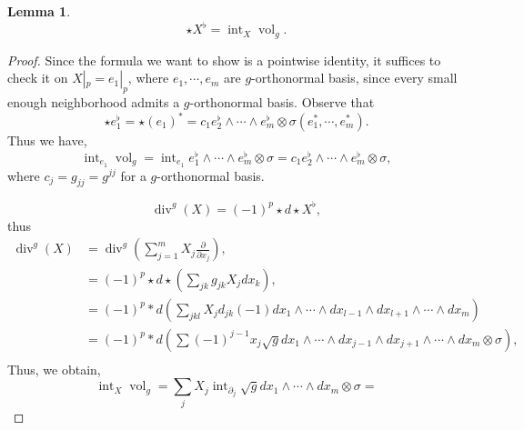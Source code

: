 \documentclass[8pt]{article}
\newtheorem{lemma}{Lemma}[section]
\DeclareMathOperator{\divergence}{div}
\DeclareMathOperator{\interior}{int}
\DeclareMathOperator{\vol}{vol}
\newcommand{\M}[0]{\mathcal{M}}
\newcommand{\cinf}[0]{\mathcal{C}^\infty}
\newcommand{\pd}[2]{{\frac {\partial #1} {\partial #2}}}
\begin{document}
\begin{lemma}
  \begin{equation*}
    \star X^\flat = \interior_X\vol_g.
  \end{equation*}
\end{lemma}
\begin{proof}
  Since the formula we want to show is a pointwise identity, it suffices to check it on $X|_p=e_1|_p$, where $e_1,\cdots,e_m$ are $g$-orthonormal basis, since every small enough neighborhood admits a $g$-orthonormal basis.
Observe that 
\begin{equation*}
  \star e_1^\flat = \star(e_1)^* = c_1e_2^\flat\wedge\cdots\wedge e_m^\flat\otimes\sigma(e_1^*,\cdots,e_m^*).
\end{equation*}
Thus we have,
\begin{equation*}
  \interior_{e_1}\vol_g = \interior_{e_1}e_1^\flat \wedge \cdots\wedge e_m^\flat \otimes \sigma = c_1e_2^\flat \wedge\cdots\wedge e_m^\flat\otimes\sigma,
\end{equation*}
where $c_j = g_{jj}=g^{jj}$ for a $g$-orthonormal basis.

\begin{center}
\end{center}
\begin{equation*}
  \divergence^g(X) = (-1)^p\star d\star X^\flat,
\end{equation*}
thus 
\begin{align*}
  \divergence^g(X) & = \divergence^g\left(\sum_{j=1}^m X_j\pd{}{x_j}\right),\\
  & = (-1)^p\star d \star\left(\sum_{jk} g_{jk}X_jdx_k\right),\\
  &= (-1)^p\ast d\left(\sum_{jkl}X_jd_{jk}(-1) dx_1\wedge\cdots\wedge dx_{l-1}\wedge dx_{l+1}\wedge\cdots\wedge dx_m\right)\\
  & = (-1)^p\ast d\left(\sum(-1)^{j-1}x_j\sqrt{g}dx_1\wedge\cdots\wedge dx_{j-1}\wedge dx_{j+1}\wedge\cdots\wedge dx_m\otimes\sigma\right),\\
\end{align*}
Thus, we obtain,
\begin{equation*}
  \interior_X\vol_g = \sum_{j}X_j\interior_{\partial_j}\sqrt{g}dx_1\wedge\cdots\wedge dx_m\otimes\sigma = 
\end{equation*}
\end{proof}
\end{document}
